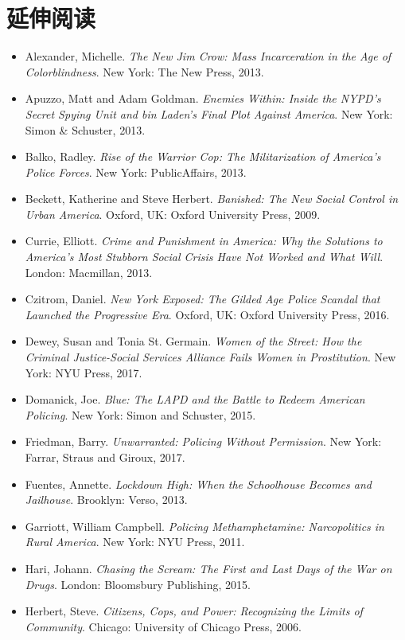\documentclass[fontset=fandol, a4paper, 12pt, openright]{ctexbook}
\begin{document}
\section*{延伸阅读}
\begin{itemize}
    \item Alexander, Michelle. \textit{The New Jim Crow: Mass Incarceration in the Age of Colorblindness}. New York: The New Press, 2013.
    \item Apuzzo, Matt and Adam Goldman. \textit{Enemies Within: Inside the NYPD's Secret Spying Unit and bin Laden's Final Plot Against America}. New York: Simon \& Schuster, 2013.
    \item Balko, Radley. \textit{Rise of the Warrior Cop: The Militarization of America's Police Forces}. New York: PublicAffairs, 2013.
    \item Beckett, Katherine and Steve Herbert. \textit{Banished: The New Social Control in Urban America}. Oxford, UK: Oxford University Press, 2009.
    \item Currie, Elliott. \textit{Crime and Punishment in America: Why the Solutions to America's Most Stubborn Social Crisis Have Not Worked and What Will}. London: Macmillan, 2013.
    \item Czitrom, Daniel. \textit{New York Exposed: The Gilded Age Police Scandal that Launched the Progressive Era}. Oxford, UK: Oxford University Press, 2016.
    \item Dewey, Susan and Tonia St. Germain. \textit{Women of the Street: How the Criminal Justice-Social Services Alliance Fails Women in Prostitution}. New York: NYU Press, 2017.
    \item Domanick, Joe. \textit{Blue: The LAPD and the Battle to Redeem American Policing}. New York: Simon and Schuster, 2015.
    \item Friedman, Barry. \textit{Unwarranted: Policing Without Permission}. New York: Farrar, Straus and Giroux, 2017.
    \item Fuentes, Annette. \textit{Lockdown High: When the Schoolhouse Becomes and Jailhouse}. Brooklyn: Verso, 2013.
    \item Garriott, William Campbell. \textit{Policing Methamphetamine: Narcopolitics in Rural America}. New York: NYU Press, 2011.
    \item Hari, Johann. \textit{Chasing the Scream: The First and Last Days of the War on Drugs}. London: Bloomsbury Publishing, 2015.
    \item Herbert, Steve. \textit{Citizens, Cops, and Power: Recognizing the Limits of Community}. Chicago: University of Chicago Press, 2006.

\end{itemize}
\end{document}
